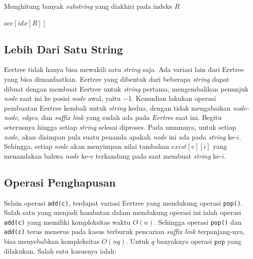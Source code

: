 \documentclass[11pt, a4paper, final]{article}
\newcommand\onlyb[1]{\normalfont{\textbf{#1}}}
\begin{document}
\begin{algorithm}
\DontPrintSemicolon
\caption{Menghitung banyak \textit{substring} yang diakhiri pada indeks $R$}\label{alg:end_R}


\onlyb{return} $occ[idx[R]]$
\end{algorithm}





\subsection{Lebih Dari Satu String}

Eertree tidak hanya bisa mewakili satu \textit{string} saja. Ada variasi lain dari Eertree yang bisa dimanfaatkan. Eertree yang dibentuk dari beberapa \textit{string} dapat dibuat dengan membuat Eertree untuk \textit{string} pertama, mengembalikan penunjuk \textit{node} saat ini ke posisi \textit{node} awal, yaitu $-1$. Kemudian lakukan operasi pembuatan Eertree kembali untuk \textit{string} kedua, dengan tidak mengabaikan \textit{node-node}, \textit{edges}, dan \textit{suffix link} yang sudah ada pada \textit{Eertree} saat ini. Begitu seterusnya hingga setiap \textit{string} selesai diproses. Pada umumnya, untuk setiap \textit{node}, akan disimpan pula suatu penanda apakah \textit{node} ini ada pada \textit{string} ke-$i$. Sehingga, setiap \textit{node} akan menyimpan nilai tambahan $exist[v][i]$ yang menandakan bahwa \textit{node} ke-$v$ terkandung pada saat membuat \textit{string} ke-$i$.

\subsection{Operasi Penghapusan}

Selain operasi \texttt{add(c)}, terdapat variasi Eertree yang mendukung operasi \texttt{pop()}. Salah satu yang menjadi hambatan dalam mendukung operasi ini ialah operasi \texttt{add(c)} yang memiliki kompleksitas waktu $O(n)$. Sehingga operasi \texttt{pop()} dan \texttt{add(c)} terus menerus pada kasus terburuk pencarian \textit{suffix link} terpanjang-nya, bisa menyebabkan kompleksitas $O(nq)$. Untuk $q$ banyaknya operasi $\texttt{pop}$ yang dilakukan. Salah satu kasusnya ialah:
\end{document}
